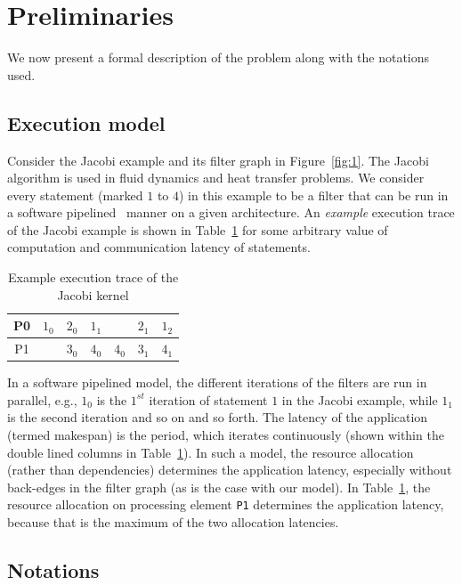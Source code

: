 \documentclass[10pt, conference, compsocconf]{IEEEtran}
\begin{document}
\section{Preliminaries}
\label{sec:preliminaries}

We now present a formal description of the problem along with the
notations used.

\subsection{Execution model}
\label{sec:execution-model}

Consider the Jacobi example and its filter graph in
Figure~\ref{fig:1}. The Jacobi algorithm is used in fluid dynamics and
heat transfer problems. We consider every statement (marked $1$ to $4$)
in this example to be a filter that can be run in a software
pipelined~\cite{audu09} manner on a given architecture. An
\textit{example} execution trace of the Jacobi example is shown in
Table~\ref{tab:3} for some arbitrary value of computation and
communication latency of statements.

\begin{table}[h!]
  \centering
  \begin{tabular}{|c|c|c||c|c|c||c|}
    \hline
    P0 & $1_0$ & $2_0$ & $1_1$ & & $2_1$ & $1_2$\\
    \hline
    P1 & & $3_0$ & $4_0$ & $4_0$ & $3_1$ & $4_1$\\
    \hline
  \end{tabular}
  \caption{Example execution trace of the Jacobi kernel}
  \label{tab:3}
\end{table}

In a software pipelined model, the different iterations of the filters
are run in parallel, e.g., $1_0$ is the $1^{st}$ iteration of statement
$1$ in the Jacobi example, while $1_1$ is the second iteration and so on
and so forth. The latency of the application (termed makespan) is the
period, which iterates continuously (shown within the double lined
columns in Table~\ref{tab:3}). In such a model, the resource allocation
(rather than dependencies) determines the application latency,
especially without back-edges in the filter graph (as is the case with
our model). In Table~\ref{tab:3}, the resource allocation on processing
element \texttt{P1} determines the application latency, because that is
the maximum of the two allocation latencies.

\subsection{Notations}
\end{document}

